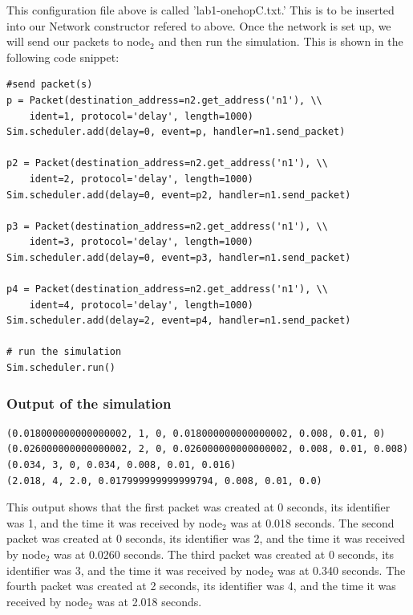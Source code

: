 \documentclass[fleqn,11pt]{article}
\begin{document}
This configuration file above is called 'lab1-onehopC.txt.' This is to be inserted into our Network constructor refered to above.
Once the network is set up, we will send our packets to node$_2$ and then run the simulation. This is shown in the following code snippet:    

\begin{lstlisting}
#send packet(s)
p = Packet(destination_address=n2.get_address('n1'), \\
	ident=1, protocol='delay', length=1000)
Sim.scheduler.add(delay=0, event=p, handler=n1.send_packet)

p2 = Packet(destination_address=n2.get_address('n1'), \\
	ident=2, protocol='delay', length=1000)
Sim.scheduler.add(delay=0, event=p2, handler=n1.send_packet)

p3 = Packet(destination_address=n2.get_address('n1'), \\
	ident=3, protocol='delay', length=1000)
Sim.scheduler.add(delay=0, event=p3, handler=n1.send_packet)

p4 = Packet(destination_address=n2.get_address('n1'), \\
	ident=4, protocol='delay', length=1000)
Sim.scheduler.add(delay=2, event=p4, handler=n1.send_packet)    

# run the simulation
Sim.scheduler.run()
\end{lstlisting}

\subsubsection{Output of the simulation}
\begin{lstlisting}
(0.018000000000000002, 1, 0, 0.018000000000000002, 0.008, 0.01, 0)
(0.026000000000000002, 2, 0, 0.026000000000000002, 0.008, 0.01, 0.008)
(0.034, 3, 0, 0.034, 0.008, 0.01, 0.016)
(2.018, 4, 2.0, 0.017999999999999794, 0.008, 0.01, 0.0)

\end{lstlisting}
This output shows that the first packet was created at 0 seconds, its identifier was 1, and the time it was received by node$_2$ was at 0.018 seconds. The second packet was created at 0 seconds, its identifier was 2, and the time it was received by node$_2$ was at 0.0260 seconds. The third packet was created at 0 seconds, its identifier was 3, and the time it was received by node$_2$ was at 0.340 seconds. The fourth packet was created at 2 seconds, its identifier was 4, and the time it was received by node$_2$ was at 2.018 seconds.
\end{document}
